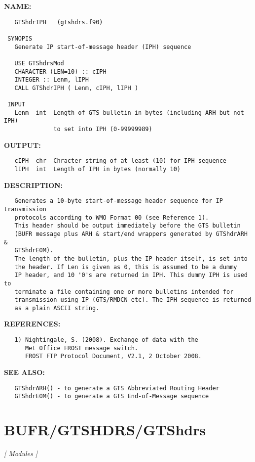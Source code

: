 \label{ch:robo11}
\label{ch:BUFR_GTSHDRS_GTShdrIPH}
\textbf{NAME:}\hspace{0.08in}\begin{Verbatim}
   GTShdrIPH   (gtshdrs.f90)

 SYNOPIS
   Generate IP start-of-message header (IPH) sequence

   USE GTShdrsMod
   CHARACTER (LEN=10) :: cIPH
   INTEGER :: Lenm, lIPH
   CALL GTShdrIPH ( Lenm, cIPH, lIPH )

 INPUT
   Lenm  int  Length of GTS bulletin in bytes (including ARH but not IPH)
              to set into IPH (0-99999989)
\end{Verbatim}
\textbf{OUTPUT:}\hspace{0.08in}\begin{Verbatim}
   cIPH  chr  Chracter string of at least (10) for IPH sequence
   lIPH  int  Length of IPH in bytes (normally 10)
\end{Verbatim}
\textbf{DESCRIPTION:}\hspace{0.08in}\begin{Verbatim}
   Generates a 10-byte start-of-message header sequence for IP transmission
   protocols according to WMO Format 00 (see Reference 1).
   This header should be output immediately before the GTS bulletin
   (BUFR message plus ARH & start/end wrappers generated by GTShdrARH &
   GTShdrEOM).
   The length of the bulletin, plus the IP header itself, is set into
   the header. If Len is given as 0, this is assumed to be a dummy
   IP header, and 10 '0's are returned in IPH. This dummy IPH is used to
   terminate a file containing one or more bulletins intended for
   transmission using IP (GTS/RMDCN etc). The IPH sequence is returned
   as a plain ASCII string.
\end{Verbatim}
\textbf{REFERENCES:}\hspace{0.08in}\begin{Verbatim}
   1) Nightingale, S. (2008). Exchange of data with the
      Met Office FROST message switch.
      FROST FTP Protocol Document, V2.1, 2 October 2008.
\end{Verbatim}
\textbf{SEE ALSO:}\hspace{0.08in}\begin{Verbatim}
   GTShdrARH() - to generate a GTS Abbreviated Routing Header
   GTShdrEOM() - to generate a GTS End-of-Message sequence
\end{Verbatim}
\section{BUFR/GTSHDRS/GTShdrs}
\textsl{[ Modules ]}


